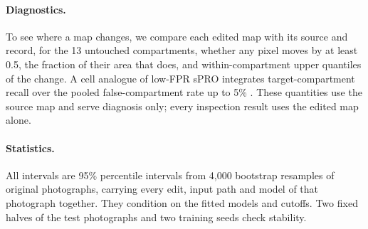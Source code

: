 \paragraph{Diagnostics.}
To see where a map changes, we compare each edited map with its source and record, for the 13 untouched compartments, whether any pixel moves by at least 0.5, the fraction of their area that does, and within-compartment upper quantiles of the change. A cell analogue of low-FPR sPRO integrates target-compartment recall over the pooled false-compartment rate up to 5\% \cite{bergmann2022}. These quantities use the source map and serve diagnosis only; every inspection result uses the edited map alone.

\paragraph{Statistics.}
All intervals are 95\% percentile intervals from 4,000 bootstrap resamples of original photographs, carrying every edit, input path and model of that photograph together. They condition on the fitted models and cutoffs. Two fixed halves of the test photographs and two training seeds check stability.
